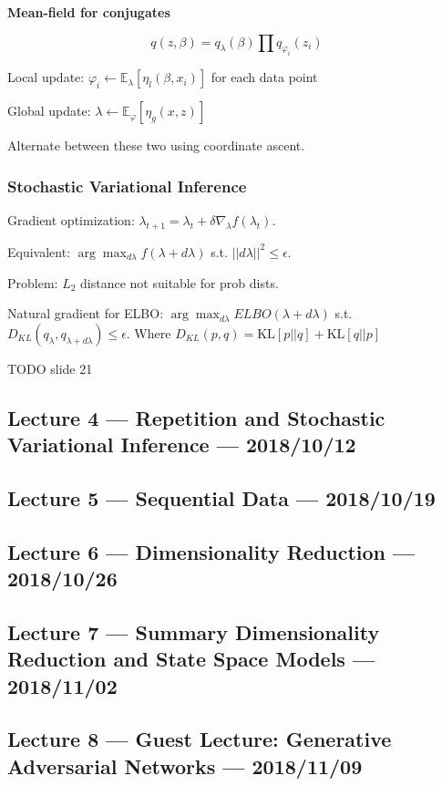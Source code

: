 \documentclass{article}
\newcommand{\E}[2]{\mathbb{E}_{#1}\left[#2\right]}
\newcommand{\KL}[2]{\mathrm{KL}\left[#1||#2\right]}
\begin{document}
\textbf{Mean-field for conjugates}

$$q(z, \beta) = q_\lambda(\beta) \prod q_{\varphi_i}(z_i)$$

Local update: $\varphi_i \leftarrow \E{\lambda}{\eta_l(\beta, x_i)}$ for each data point

Global update: $\lambda \leftarrow \E{\varphi}{\eta_g(x, z)}$

Alternate between these two using coordinate ascent.

\subsubsection{Stochastic Variational Inference}

Gradient optimization: $\lambda_{t+1} = \lambda_t + \delta \nabla_\lambda f(\lambda_t)$.

Equivalent: $\arg\max_{d\lambda} f(\lambda + d\lambda)$ s.t. $||d\lambda||^2 \leq \epsilon$.

Problem: $L_2$ distance not suitable for prob dists.

Natural gradient for ELBO: $\arg\max_{d\lambda} ELBO(\lambda + d\lambda)$ s.t. $D_{KL}(q_\lambda, q_{\lambda + d\lambda}) \leq \epsilon$. Where $D_{KL}(p, q) = \KL{p}{q} + \KL{q}{p}$

TODO slide 21 





\subsection{Lecture 4 --- Repetition and Stochastic Variational Inference --- 2018/10/12}

\subsection{Lecture 5 --- Sequential Data --- 2018/10/19}

\subsection{Lecture 6 --- Dimensionality Reduction --- 2018/10/26}

\subsection{Lecture 7 --- Summary Dimensionality Reduction and State Space Models --- 2018/11/02}

\subsection{Lecture 8 --- Guest Lecture: Generative Adversarial Networks --- 2018/11/09}
\end{document}
